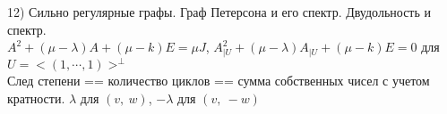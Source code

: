 12) Сильно регулярные графы. Граф Петерсона и его спектр. Двудольность и спектр.\\
$A^2+(\mu-\lambda)A + (\mu-k)E=\mu J$,
$A_{|U}^2 + (\mu-\lambda)A_{|U} + (\mu-k)E = 0$ для 
$U = <(1,\cdots,1)>^{\bot}$\\
След степени == количество циклов == сумма собственных чисел с учетом кратности. $\lambda$ для 
$(v,\:w)$, $-\lambda$ для $(v,\:-w)$\\
